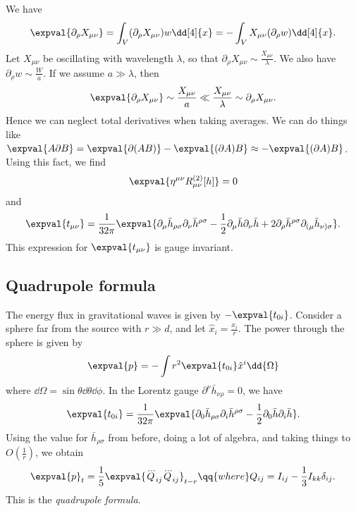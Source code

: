 \documentclass{jknotes}
\begin{document}
We have
\begin{equation}
    \expval{\partial_\rho X_{\mu\nu}} = \int_V(\partial_\rho X_{\mu\nu})w\dd[4]{x} = -\int_V X_{\mu\nu}(\partial_\rho w)\dd[4]{x}.
\end{equation}
Let \(X_{\mu\nu}\) be oscillating with wavelength \(\lambda\), so that \(\partial_\rho X_{\mu\nu} \sim \frac{X_{\mu\nu}}{\lambda}\). We also have \(\partial_\rho w \sim \frac{W}{a}\). If we assume \(a \gg \lambda\), then
\begin{equation}
    \expval{\partial_\rho X_{\mu\nu}}\sim \frac{X_{\mu\nu}}{a} \ll \frac{X_{\mu\nu}}{\lambda} \sim \partial_\rho X_{\mu\nu}.
\end{equation}
Hence we can neglect total derivatives when taking averages. We can do things like \(\expval{A\partial B} = \expval{\partial(AB)} - \expval{(\partial A) B} \approx - \expval{(\partial A)B}\). Using this fact, we find
\begin{equation}
    \expval{\eta^{\mu\nu}R^{(2)}_{\mu\nu}[h]} = 0
\end{equation}
and
\begin{equation}
    \expval{t_{\mu\nu}} = \frac1{32\pi}\expval{\partial_\mu\bar{h}_{\rho\sigma}\partial_\nu\bar{h}^{\rho\sigma} - \frac12\partial_\mu\bar{h}\partial_\nu\bar{h} + 2\partial_\rho\bar{h}^{\rho\sigma}\partial_{(\mu}\bar{h}_{\nu)\sigma}}.
\end{equation}
This expression for \(\expval{t_{\mu\nu}}\) is gauge invariant.

\subsection{Quadrupole formula}
The energy flux in gravitational waves is given by \(-\expval{t_{0i}}\). Consider a sphere far from the source with \(r\gg d\), and let \(\hat{x}_i = \frac{x_i}{r}\). The power through the sphere is given by
\begin{equation}
    \expval{p} = -\int r^2\expval{t_{0i}}\hat{x}^i\dd{\Omega}
\end{equation}
where \(\dd{\Omega} = \sin\theta\dd{\theta}\dd{\phi}\). In the Lorentz gauge \(\partial^\nu\bar{h}_{\nu\rho}=0\), we have
\begin{equation}
    \expval{t_{0i}} = \frac1{32\pi}\expval{\partial_0\bar{h}_{\rho\sigma}\partial_i\bar{h}^{\rho\sigma} - \frac12\partial_0\bar{h}\partial_i\bar{h}}.
\end{equation}
Using the value for \(\bar{h}_{\rho\sigma}\) from before, doing a lot of algebra, and taking things to \(O\left(\frac1r\right)\), we obtain
\begin{equation}
    \expval{p}_t = \frac15\expval{\dddot{Q}_{ij}\dddot{Q}_{ij}}_{t-r} \qq{where} Q_{ij} = I_{ij}-\frac13I_{kk}\delta_{ij}.
\end{equation}
This is the \emph{quadrupole formula}.
\end{document}
